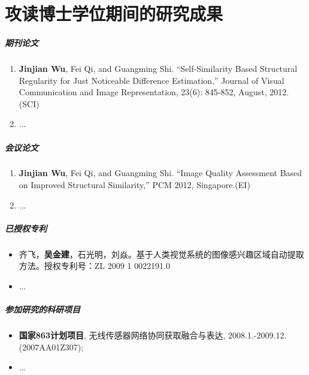 
\chapter*{攻读博士学位期间的研究成果}
\label{char:achi}

\paragraph{期刊论文}

\begin{enumerate}
\item \textbf{Jinjian Wu}, Fei Qi, and Guangming Shi. “Self-Similarity Based Structural Regularity for Just Noticeable Difference Estimation,” Journal of Visual Communication and Image Representation, 23(6): 845-852, August, 2012.(SCI)

\item ...
\end{enumerate}

\paragraph{会议论文}
\begin{enumerate}
\item \textbf{Jinjian Wu}, Fei Qi, and Guangming Shi. “Image Quality Assessment Based on Improved Structural Similarity,” PCM 2012, Singapore.(EI)

\item ...
\end{enumerate}


\paragraph{已授权专利}

\begin{itemize}
\item
齐飞，\textbf{吴金建}，石光明，刘焱。基于人类视觉系统的图像感兴趣区域自动提取方法。授权专利号：ZL 2009 1 0022191.0

\item...
\end{itemize}

\paragraph{参加研究的科研项目}

\begin{itemize}
\item 
\textbf{国家863计划项目}, 无线传感器网络协同获取融合与表达, 2008.1.-2009.12. (2007AA01Z307);
\item ...
\end{itemize}

